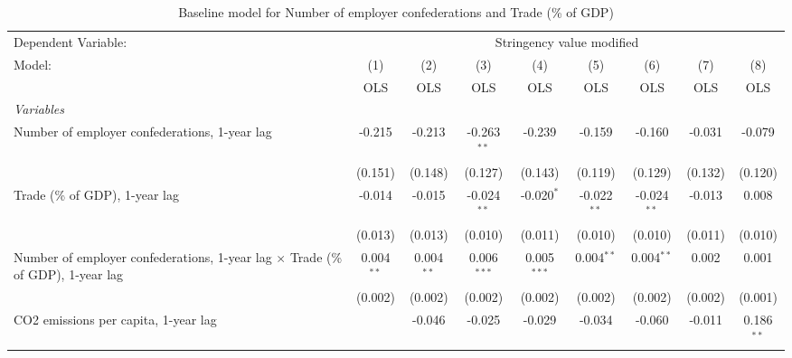 
\begin{table}[htbp]
   \caption{Baseline model for Number of employer confederations and Trade (\% of GDP)}
   \centering
   \begin{tabular}{lcccccccc}
      \toprule
      Dependent Variable: & \multicolumn{8}{c}{Stringency value modified}\\
      Model:                                                                                 & (1)          & (2)          & (3)           & (4)           & (5)           & (6)           & (7)          & (8)\\  
                                                                                             &  OLS         & OLS          & OLS           & OLS           & OLS           & OLS           & OLS          & OLS\\  
      \midrule
      \emph{Variables}\\
      Number of employer confederations, 1-year lag                                          & -0.215       & -0.213       & -0.263$^{**}$ & -0.239        & -0.159        & -0.160        & -0.031       & -0.079\\   
                                                                                             & (0.151)      & (0.148)      & (0.127)       & (0.143)       & (0.119)       & (0.129)       & (0.132)      & (0.120)\\   
      Trade (\% of GDP), 1-year lag                                                          & -0.014       & -0.015       & -0.024$^{**}$ & -0.020$^{*}$  & -0.022$^{**}$ & -0.024$^{**}$ & -0.013       & 0.008\\   
                                                                                             & (0.013)      & (0.013)      & (0.010)       & (0.011)       & (0.010)       & (0.010)       & (0.011)      & (0.010)\\   
      Number of employer confederations, 1-year lag $\times$ Trade (\% of GDP), 1-year lag   & 0.004$^{**}$ & 0.004$^{**}$ & 0.006$^{***}$ & 0.005$^{***}$ & 0.004$^{**}$  & 0.004$^{**}$  & 0.002        & 0.001\\   
                                                                                             & (0.002)      & (0.002)      & (0.002)       & (0.002)       & (0.002)       & (0.002)       & (0.002)      & (0.001)\\   
      CO2 emissions per capita, 1-year lag                                                   &              & -0.046       & -0.025        & -0.029        & -0.034        & -0.060        & -0.011       & 0.186$^{**}$\\   

\end{tabular}
\end{table}
